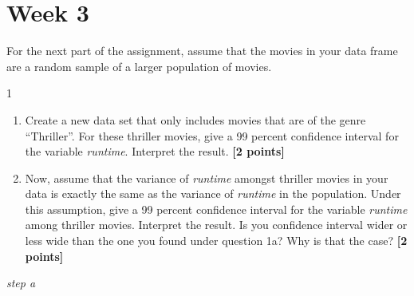 \documentclass[
]{article}
\newenvironment{Shaded}{\begin{snugshade}}{\end{snugshade}}
\newcommand{\AttributeTok}[1]{\textcolor[rgb]{0.13,0.29,0.53}{#1}}
\newcommand{\CommentTok}[1]{\textcolor[rgb]{0.56,0.35,0.01}{\textit{#1}}}
\newcommand{\ConstantTok}[1]{\textcolor[rgb]{0.56,0.35,0.01}{#1}}
\newcommand{\DecValTok}[1]{\textcolor[rgb]{0.00,0.00,0.81}{#1}}
\newcommand{\FloatTok}[1]{\textcolor[rgb]{0.00,0.00,0.81}{#1}}
\newcommand{\FunctionTok}[1]{\textcolor[rgb]{0.13,0.29,0.53}{\textbf{#1}}}
\newcommand{\NormalTok}[1]{#1}
\newcommand{\OtherTok}[1]{\textcolor[rgb]{0.56,0.35,0.01}{#1}}
\newcommand{\SpecialCharTok}[1]{\textcolor[rgb]{0.81,0.36,0.00}{\textbf{#1}}}
\newcommand{\StringTok}[1]{\textcolor[rgb]{0.31,0.60,0.02}{#1}}
\providecommand{\tightlist}{%
  \setlength{\itemsep}{0pt}\setlength{\parskip}{0pt}}
\begin{document}
\section{Week 3}\label{week-3}

For the next part of the assignment, assume that the movies in your data
frame are a random sample of a larger population of movies.

1

\begin{enumerate}
\def\labelenumi{\alph{enumi}.}
\tightlist
\item
  Create a new data set that only includes movies that are of the genre
  ``Thriller''. For these thriller movies, give a 99 percent confidence
  interval for the variable \emph{runtime}. Interpret the result.
  \textbf{[2 points]}
\item
  Now, assume that the variance of \emph{runtime} amongst thriller
  movies in your data is exactly the same as the variance of
  \emph{runtime} in the population. Under this assumption, give a 99
  percent confidence interval for the variable \emph{runtime} among
  thriller movies. Interpret the result. Is you confidence interval
  wider or less wide than the one you found under question 1a? Why is
  that the case? \textbf{[2 points]}
\end{enumerate}

\emph{step a}

\begin{Shaded}
\end{Shaded}
\end{document}

